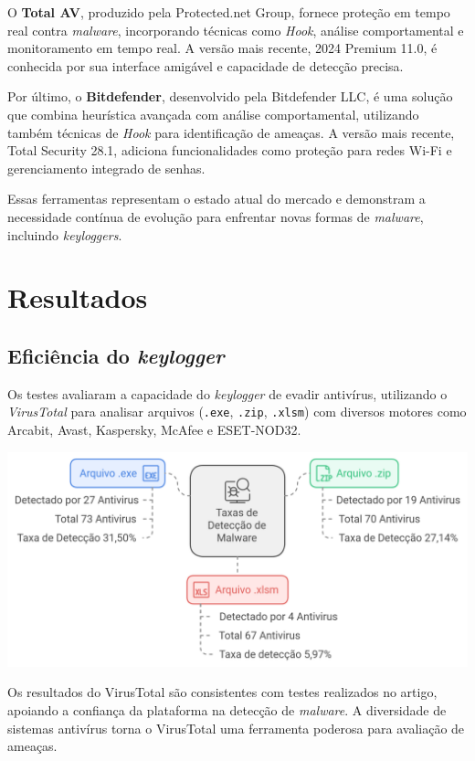 \documentclass[12pt]{article}
\begin{document}
O \textbf{Total AV}, produzido pela Protected.net Group, fornece proteção em tempo real contra \textit{malware}, incorporando técnicas como \textit{Hook}, análise comportamental e monitoramento em tempo real. A versão mais recente, 2024 Premium 11.0, é conhecida por sua interface amigável e capacidade de detecção precisa.

Por último, o \textbf{Bitdefender}, desenvolvido pela Bitdefender LLC, é uma solução que combina heurística avançada com análise comportamental, utilizando também técnicas de \textit{Hook} para identificação de ameaças. A versão mais recente, Total Security 28.1, adiciona funcionalidades como proteção para redes Wi-Fi e gerenciamento integrado de senhas.

Essas ferramentas representam o estado atual do mercado e demonstram a necessidade contínua de evolução para enfrentar novas formas de \textit{malware}, incluindo \textit{keyloggers}.


\section{Resultados}

\subsection{Eficiência do \textit{keylogger}}
Os testes avaliaram a capacidade do \textit{keylogger} de evadir antivírus, utilizando o \textit{VirusTotal} para analisar arquivos (\texttt{.exe}, \texttt{.zip}, \texttt{.xlsm}) com diversos motores como Arcabit, Avast, Kaspersky, McAfee e ESET-NOD32.
\begin{center}
    \includegraphics[width=1\textwidth]{imgs/ViruzTotal.png} %
\end{center}
Os resultados do VirusTotal são consistentes com testes realizados no artigo, apoiando a confiança da plataforma na detecção de \textit{malware}. A diversidade de sistemas antivírus torna o VirusTotal uma ferramenta poderosa para avaliação de ameaças.
\end{document}
